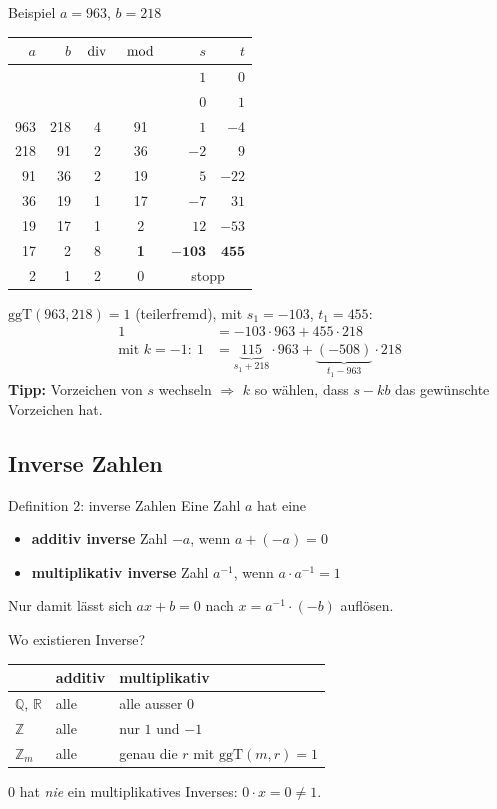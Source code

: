 \documentclass[a4paper, fontsize=7pt]{scrartcl}
\def\Z{\mathbb{Z}}  %
\def\Q{\mathbb{Q}}  %
\def\R{\mathbb{R}}  %
\newcommand{\Div}{\mskip3mu\mathrm{div}\mskip3mu}
\newcommand{\Mod}{\mskip3mu\mathrm{mod}\mskip3mu}
\renewcommand*{\arraystretch}{1.5}  %
\begin{document}
\begin{subbox}{Beispiel $a=963$, $b=218$}
\renewcommand*{\arraystretch}{1.1}
\begin{center}
\setlength{\tabcolsep}{4pt}
\begin{tabular}{@{}rr|cc|rr@{}}
$a$ & $b$ & $\Div$ & $\Mod$ & $s$ & $t$ \\
\hline
 & & & & $1$ & $0$ \\
 & & & & $0$ & $1$ \\
963 & 218 & 4 & 91 & $1$ & $-4$ \\
218 & 91 & 2 & 36 & $-2$ & $9$ \\
91 & 36 & 2 & 19 & $5$ & $-22$ \\
36 & 19 & 1 & 17 & $-7$ & $31$ \\
19 & 17 & 1 & 2 & $12$ & $-53$ \\
17 & 2 & 8 & \textbf{1} & $\mathbf{-103}$ & $\mathbf{455}$ \\
2 & 1 & 2 & 0 & \multicolumn{2}{c}{stopp} \\
\end{tabular}
\end{center}
$\mathrm{ggT}(963,218) = 1$ (teilerfremd), mit $s_1 = -103$, $t_1 = 455$:
\begin{align*}
1 &= -103 \cdot 963 + 455 \cdot 218\\
\text{mit } k = -1:\ 1 &= \underbrace{115}_{s_1 + 218} \cdot 963 +
  \underbrace{(-508)}_{t_1 - 963} \cdot 218
\end{align*}
\textbf{Tipp:} Vorzeichen von $s$ wechseln $\Rightarrow$ $k$ so wählen, dass
$s - k b$ das gewünschte Vorzeichen hat.
\end{subbox}

\subsection{Inverse Zahlen}

\begin{mainbox}{Definition 2: inverse Zahlen}
Eine Zahl $a$ hat eine
\begin{itemize}
    \item \textbf{additiv inverse} Zahl $-a$, wenn $a + (-a) = 0$
    \item \textbf{multiplikativ inverse} Zahl $a^{-1}$, wenn
          $a \cdot a^{-1} = 1$
\end{itemize}
Nur damit lässt sich $a x + b = 0$ nach $x = a^{-1}\cdot(-b)$ auflösen.
\end{mainbox}

\begin{subbox}{Wo existieren Inverse?}
\renewcommand*{\arraystretch}{1.15}
\begin{tabularx}{\linewidth}{@{}l|X|X@{}}
 & \textbf{additiv} & \textbf{multiplikativ} \\
\hline
$\Q$, $\R$ & alle & alle ausser $0$ \\
$\Z$ & alle & nur $1$ und $-1$ \\
$\Z_m$ & alle & genau die $r$ mit $\mathrm{ggT}(m,r)=1$ \\
\end{tabularx}
$0$ hat \emph{nie} ein multiplikatives Inverses: $0 \cdot x = 0 \neq 1$.
\end{subbox}
\end{document}

